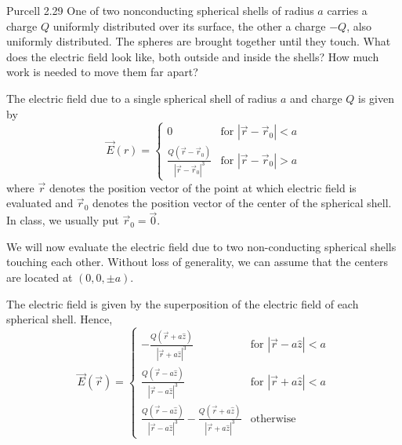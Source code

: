 \documentclass{esg8022pset}
\begin{document}
\begin{problem}{Purcell 2.29}
  One of two nonconducting spherical shells of radius $a$ carries
  a charge $Q$ uniformly distributed over its surface, the other a charge
  $-Q$, also uniformly distributed. The spheres are brought together 
  until they touch. What does the electric field look like, both outside 
  and inside the shells? How much work is needed to move them far 
  apart?
\end{problem}
\begin{solution}
  The electric field due to a single spherical shell of radius $a$ and charge $Q$ is given by
  $$\vec{E}(r) = 
    \begin{cases}
      0  & \text{for }|\vec{r} - \vec{r}_{0}|<a \\
      \frac{Q \left(\vec{r} - \vec{r}_{0}\right)}{|\vec{r} - \vec{r}_{0}|^3} & \text{for }|\vec{r} - \vec{r}_{0}|>a
    \end{cases}
  $$
  where $\vec{r}$ denotes the position vector of the point at which electric field is evaluated and $\vec r_0$ denotes the position vector of the center of the spherical shell.  In class, we usually put $\vec r_0 = \vec 0$.
  
  We will now evaluate the electric field due to two non-conducting spherical shells touching each other. Without loss of generality, we can assume that the centers are located at $(0,0,\pm a)$.
  \begin{center}
  \end{center}
  The electric field is given by the superposition of the electric field of each spherical shell. Hence,
  $$\vec E(\vec{r}) = 
    \begin{cases}
      -\frac{Q \left(\vec{r}  + a \hat z \right)}{|\vec{r} + a \hat z|^3} & \text{for }|\vec{r} - a \hat z| < a \\
      \frac{Q \left(\vec{r}  - a \hat z \right)}{|\vec{r} - a \hat z|^3} & \text{for }|\vec{r} + a \hat z| < a \\
      \frac{Q \left(\vec{r}  - a \hat z \right)}{|\vec{r} - a \hat z|^3} - \frac{Q \left(\vec{r}  + a \hat z \right)}{|\vec{r} + a \hat z|^3} & \text{otherwise}
    \end{cases}
  $$
  

\end{solution}
\end{document}
